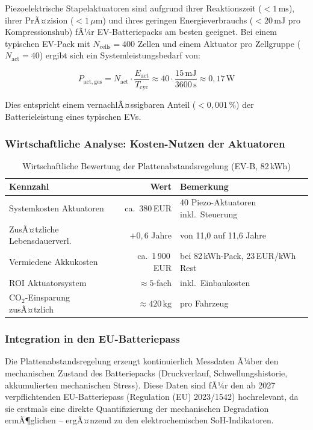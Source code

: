 ﻿\documentclass[12pt,a4paper]{article}
\begin{document}
Piezoelektrische Stapelaktuatoren sind aufgrund ihrer Reaktionszeit
($< 1\,\mathrm{ms}$), ihrer PrÃ¤zision ($< 1\,\mu\mathrm{m}$) und ihres
geringen Energieverbrauchs ($< 20\,\mathrm{mJ}$ pro Kompressionshub) fÃ¼r
EV-Batteriepacks am besten geeignet. Bei einem typischen EV-Pack mit
$N_\mathrm{cells} = 400$ Zellen und einem Aktuator pro Zellgruppe
($N_\mathrm{act} = 40$) ergibt sich ein Systemleistungsbedarf von:

\begin{equation}
	P_\mathrm{act,ges} = N_\mathrm{act} \cdot \frac{E_\mathrm{act}}{T_\mathrm{cyc}}
	\approx 40 \cdot \frac{15\,\mathrm{mJ}}{3600\,\mathrm{s}} \approx 0{,}17\,\mathrm{W}
	\label{eq:actuator_power}
\end{equation}

Dies entspricht einem vernachlÃ¤ssigbaren Anteil ($< 0{,}001\,\%$) der
Batterieleistung eines typischen EVs.

\subsubsection{Wirtschaftliche Analyse: Kosten-Nutzen der Aktuatoren}

\begin{table}[H]
	\centering
	\caption{Wirtschaftliche Bewertung der Plattenabstandsregelung (EV-B, 82\,kWh)}
	\label{tab:actuator_economics}
	\begin{tabular}{lrl}
		\toprule
		\textbf{Kennzahl} & \textbf{Wert} & \textbf{Bemerkung} \\
		\midrule
		Systemkosten Aktuatoren & ca.\ 380\,EUR & 40 Piezo-Aktuatoren inkl.\ Steuerung \\
		ZusÃ¤tzliche Lebensdauerverl. & $+0{,}6$ Jahre & von 11{,}0 auf 11{,}6 Jahre \\
		Vermiedene Akkukosten & ca.\ 1\,900\,EUR & bei 82\,kWh-Pack, 23\,EUR/kWh Rest \\
		ROI Aktuatorsystem & $\approx 5$-fach & inkl.\ Einbaukosten \\
		CO$_2$-Einsparung zusÃ¤tzlich & $\approx 420\,\mathrm{kg}$ & pro Fahrzeug \\
		\bottomrule
	\end{tabular}
\end{table}

\subsubsection{Integration in den EU-Batteriepass}

Die Plattenabstandsregelung erzeugt kontinuierlich Messdaten Ã¼ber den
mechanischen Zustand des Batteriepacks (Druckverlauf, Schwellungshistorie,
akkumulierten mechanischen Stress). Diese Daten sind fÃ¼r den ab 2027
verpflichtenden EU-Batteriepass (Regulation (EU) 2023/1542) hochrelevant,
da sie erstmals eine direkte Quantifizierung der mechanischen Degradation
ermÃ¶glichen -- ergÃ¤nzend zu den elektrochemischen SoH-Indikatoren.
\end{document}
